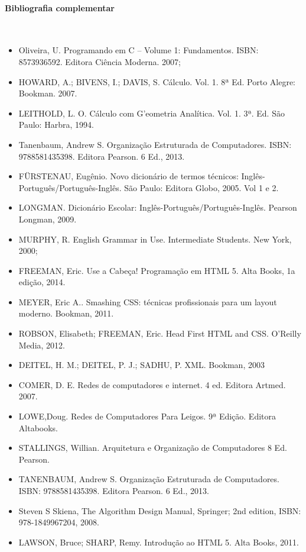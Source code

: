 \paragraph{Bibliografia complementar}\
\
\begin{itemize}
	\item Oliveira, U. Programando em C – Volume 1: Fundamentos. ISBN: 8573936592. Editora Ciência Moderna. 2007;
	\item  HOWARD, A.; BIVENS, I.; DAVIS, S. Cálculo. Vol. 1. 8ª Ed. Porto Alegre: Bookman.  2007.
	\item  LEITHOLD, L. O. Cálculo com G'eometria Analítica. Vol. 1. 3ª. Ed. São Paulo: Harbra, 1994.
	\item Tanenbaum, Andrew S. Organização Estruturada de Computadores. ISBN: 9788581435398. Editora Pearson. 6 Ed., 2013.
    \item FÜRSTENAU, Eugênio. Novo dicionário de termos técnicos: Inglês-Português/Português-Inglês. São Paulo: Editora Globo, 2005. Vol 1 e 2.
    \item LONGMAN. Dicionário Escolar: Inglês-Português/Português-Inglês. Pearson Longman, 2009.
    \item MURPHY, R. English Grammar in Use. Intermediate Students. New York, 2000;
    \item FREEMAN, Eric.
          Use a Cabeça! Programação em HTML 5.
          Alta Books, 1a edição, 2014.

    \item MEYER, Eric A..
          Smashing CSS: técnicas profissionais para um layout moderno.
          Bookman, 2011.

    \item ROBSON, Elisabeth; FREEMAN, Eric.
          Head First HTML and CSS.
          O'Reilly Media, 2012.

    \item DEITEL, H. M.; DEITEL, P. J.; SADHU, P.
          XML.
          Bookman, 2003
	\item COMER, D. E. Redes de computadores e internet. 4 ed. Editora Artmed. 2007.
	\item LOWE,Doug. Redes de Computadores Para Leigos. 9ª Edição. Editora Altabooks.
	\item STALLINGS, Willian. Arquitetura e Organização de Computadores 8 Ed. Pearson.
	\item TANENBAUM, Andrew S. Organização Estruturada de Computadores. ISBN: 9788581435398. Editora Pearson. 6 Ed., 2013.
	\item Steven S Skiena, The Algorithm Design Manual, Springer; 2nd edition, ISBN: 978-1849967204, 2008.
    \item LAWSON, Bruce; SHARP, Remy.
          Introdução ao HTML 5.
          Alta Books, 2011.


\end{itemize}
